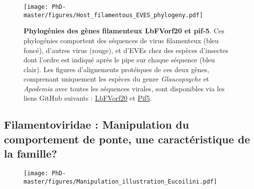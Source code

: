 \begin{figure}[!htpbt]
\captionsetup{font=footnotesize}
 \centering
  \texttt{[image: PhD-master/figures/Host\_filamentous\_EVES\_phylogeny.pdf]}
\caption[Discuss:Phylogénies des gènes filamenteux LbFVorf20 et pif-5]{\textbf{Phylogénies des gènes filamenteux LbFVorf20 et pif-5}. Ces phylogénies comportent des séquences de virus filamenteux (bleu foncé), d'autres virus (rouge), et d'EVEs chez des espèces d'insectes dont l'ordre est indiqué après le pipe sur chaque séquence (bleu clair). Les figures d'alignements protéiques de ces deux gènes, comprenant uniquement les espèces du genre \textit{Glaucopsyche} et \textit{Apodemia} avec toutes les séquences virales, sont disponibles via les liens GitHub suivants : \href{https://github.com/BenjaminGuinet/PhD_defense/blob/main/Discussion/LbFVorf20_lepido_filamentous_MSA.pdf}{LbFVorf20} et \href{https://github.com/BenjaminGuinet/PhD_defense/blob/main/Discussion/Pif5_lepido_filamentous_MSA.pdf}{Pif5}.}
\label{figure:Host_filamentous_EVES_phylogeny}
\end{figure}


\newpage

\subsection{Filamentoviridae : Manipulation du comportement de ponte, une caractéristique de la famille?}

\begin{figure}[H]
\captionsetup{font=footnotesize}
 \centering
  \texttt{[image: PhD-master/figures/Manipulation\_illustration\_Eucoilini.pdf]}
\label{figure:Manipulation_illustration_Eucoilini}
\end{figure}

